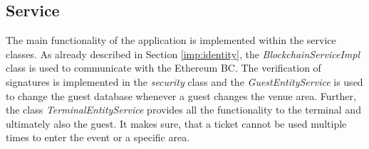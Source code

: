 \subsection{Service}

The main functionality of the application is implemented within the service classes. As already described in Section \ref{imp:identity}, the \textit{BlockchainServiceImpl} class is used to communicate with the Ethereum BC.
The verification of signatures is implemented in the \textit{security} class and the \textit{GuestEntityService} is used to change the guest database whenever a guest changes the venue area. 
Further, the class \textit{TerminalEntityService} provides all the functionality to the terminal and ultimately also the guest. It makes sure, that a ticket cannot be used multiple times to enter the event or a specific area.
